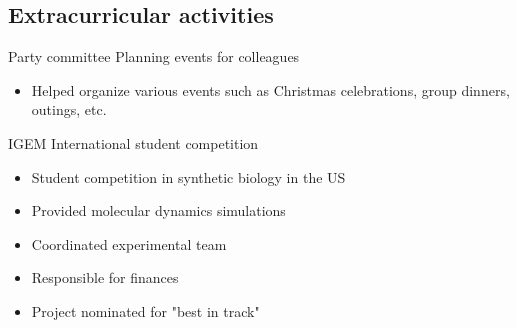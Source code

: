 \documentclass[letterpaper]{twentysecondcv} %
\begin{document}

\newpage %

\makeprofile %

\subsection{Extracurricular activities}

\begin{twenty}
		{Party committee}
		{Planning events for colleagues}
		{\begin{itemize}
			\item Helped organize various events such as Christmas celebrations, group dinners, outings, etc.
		\end{itemize}}
		{IGEM}
		{International student competition}
		{\begin{itemize}
			\item Student competition in synthetic biology in the US
			\item Provided molecular dynamics simulations
			\item Coordinated experimental team
			\item Responsible for finances
			\item Project nominated for "best in track"
		\end{itemize}}
\end{twenty}
		
		
\end{document}
